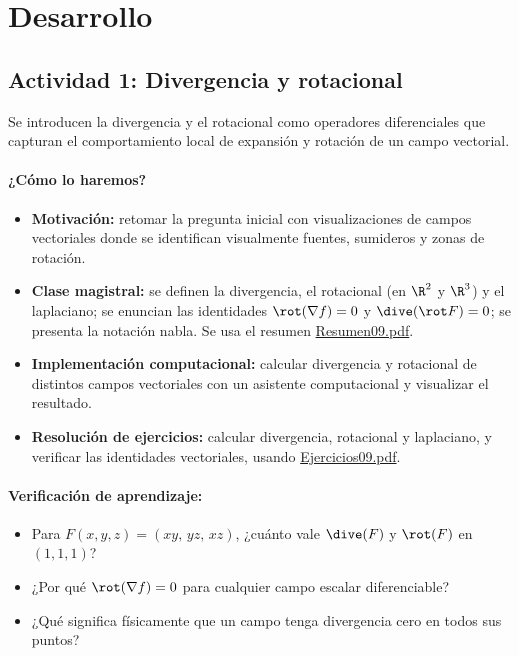 \documentclass[a4,11pt]{aleph-notas}
\begin{document}
\section*{Desarrollo}

\subsection*{Actividad 1: Divergencia y rotacional}
Se introducen la divergencia y el rotacional como operadores diferenciales que capturan el comportamiento local de expansión y rotación de un campo vectorial.

\paragraph{¿Cómo lo haremos?}
\begin{itemize}[leftmargin=*]
    \item \textbf{Motivación:} retomar la pregunta inicial con visualizaciones de campos vectoriales donde se identifican visualmente fuentes, sumideros y zonas de rotación.
    \item \textbf{Clase magistral:} se definen la divergencia, el rotacional (en $\R^2$ y $\R^3$) y el laplaciano; se enuncian las identidades $\rot(\nabla f)=0$ y $\dive(\rot F)=0$; se presenta la notación nabla. Se usa el resumen \href{https://andres-merino.github.io/MatematicaIII-05-N0051/01Resumen/Resumen09.pdf}{Resumen09.pdf}.
    \item \textbf{Implementación computacional:} calcular divergencia y rotacional de distintos campos vectoriales con un asistente computacional y visualizar el resultado.
    \item \textbf{Resolución de ejercicios:} calcular divergencia, rotacional y laplaciano, y verificar las identidades vectoriales, usando \href{https://andres-merino.github.io/MatematicaIII-05-N0051/04Ejercicios/Ejercicios09.pdf}{Ejercicios09.pdf}.
\end{itemize}

\paragraph{Verificación de aprendizaje:}
\begin{itemize}[leftmargin=*]
    \item Para $F(x,y,z)=(xy,\,yz,\,xz)$, ¿cuánto vale $\dive(F)$ y $\rot(F)$ en $(1,1,1)$?
    \item ¿Por qué $\rot(\nabla f)=0$ para cualquier campo escalar diferenciable?
    \item ¿Qué significa físicamente que un campo tenga divergencia cero en todos sus puntos?
\end{itemize}
\end{document}
